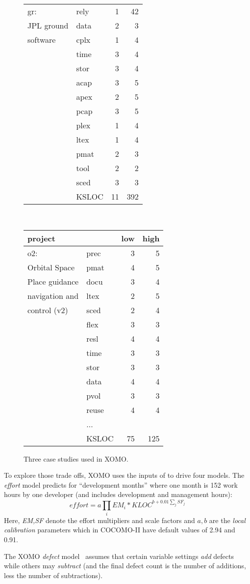 \begin{figure}[!t]
\begin{tabular}{l@{~}|l@{~}r@{~}r@{~}}
gr:&rely&1&42\\
JPL ground &data&2&3\\
software&cplx&1&4\\
&time&3&4\\
&stor&3&4\\
&acap&3&5\\
&apex&2&5\\
&pcap&3&5\\
&plex&1&4\\
&ltex&1&4\\
&pmat&2&3\\
&tool&2&2\\
&sced&3&3\\
&KSLOC&11&392
\end{tabular}~~~~~~~~~~~~~~~~~~~~~~\begin{tabular}{l@{~}|l@{~}r@{~}r@{~}}
project&&low&high\\\hline
o2:&prec&3&5\\
Orbital Space&pmat&4&5\\
Place guidance&docu&3&4\\
navigation and&ltex&2&5\\
control (v2)&sced&2&4\\
&flex&3&3\\
&resl&4&4\\
&time&3&3\\
&stor&3&3\\
&data&4&4\\
&pvol&3&3\\
&reuse&4&4\\
&...&&\\
&KSLOC&75&125
\end{tabular}
\caption{Three case studies used in XOMO.}\label{fig:xomocases}
\end{figure}

To explore those trade offs, XOMO uses the inputs of 
to drive  four models. The {\em effort} model predicts for 
``development months'' where one month
is 152 work hours by one developer (and includes development and management hours): 
\begin{equation}\label{eq:cocII}
\mathit{effort}=a\prod_i EM_i *\mathit{KLOC}^{b+0.01\sum_j SF_j}
\end{equation}
Here, {\em EM,SF} denote the effort multipliers and scale
factors and
 $a,b$ are the {\em local calibration} parameters which in COCOMO-II
have default values of 2.94 and 0.91.

The XOMO {\em defect}
model~\cite{boehm00b}  assumes that
certain variable settings {\em add} defects while
others may {\em subtract} (and the final defect count is the number of additions, less the
number of subtractions). 

